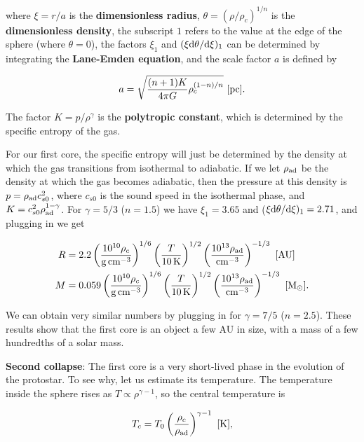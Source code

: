 \documentclass[a4paper,10pt]{article}
\begin{document}
{\noindent}where $\xi=r/a$ is the \textbf{dimensionless radius}, $\theta=(\rho/\rho_c)^{1/n}$ is the \textbf{dimensionless density}, the subscript $1$ refers to the value at the edge of the sphere (where $\theta=0$), the factors $\xi_1$ and $(\xi{\rm d}\theta/{\rm d}\xi)_1$ can be determined by integrating the \textbf{Lane-Emden equation}, and the scale factor $a$ is defined by

\begin{align*}
    a = \sqrt{\frac{(n+1)K}{4\pi G}\rho_c^{(1-n)/n}} ~ [{\rm pc}].
\end{align*}

{\noindent}The factor $K=p/\rho^\gamma$ is the \textbf{polytropic constant}, which is determined by the specific entropy of the gas.

{\noindent}For our first core, the specific entropy will just be determined by the density at which the gas transitions from isothermal to adiabatic. If we let $\rho_{\rm ad}$ be the density at which the gas becomes adiabatic, then the pressure at this density is $p=\rho_{\rm ad}c_{s0}^2$, where $c_{s0}$ is the sound speed in the isothermal phase, and $K=c_{s0}^2\rho_{\rm ad}^{1-\gamma}$. For $\gamma=5/3$ ($n=1.5$) we have $\xi_1=3.65$ and ($\xi{\rm d}\theta/{\rm d}\xi)_1=2.71$, and plugging in we get

\begin{align*}
    R &= 2.2 \left(\frac{10^{10}\rho_c}{{\rm g\,cm^{-3}}}\right)^{1/6} \left(\frac{T}{10\,{\rm K}}\right)^{1/2} \left(\frac{10^{13}\rho_{\rm ad}}{{\rm cm^{-3}}}\right)^{-1/3} ~ [{\rm AU}] \\
    M &= 0.059 \left(\frac{10^{10}\rho_c}{{\rm g\,cm^{-3}}}\right)^{1/6} \left(\frac{T}{10\,{\rm K}}\right)^{1/2} \left(\frac{10^{13}\rho_{\rm ad}}{{\rm cm^{-3}}}\right)^{-1/3} ~ [{\rm M_\odot}].
\end{align*}

{\noindent}We can obtain very similar numbers by plugging in for $\gamma=7/5$ ($n=2.5$). These results show that the first core is an object a few AU in size, with a mass of a few hundredths of a solar mass.

{\noindent}\textbf{Second collapse}: The first core is a very short-lived phase in the evolution of the protostar. To see why, let us estimate its temperature. The temperature inside the sphere rises as $T\propto\rho^{\gamma-1}$, so the central temperature is

\begin{align*}
    T_c = T_0 \left(\frac{\rho_c}{\rho_{\rm ad}}\right) ^{\gamma-1} ~ [{\rm K}],
\end{align*}
\end{document}
